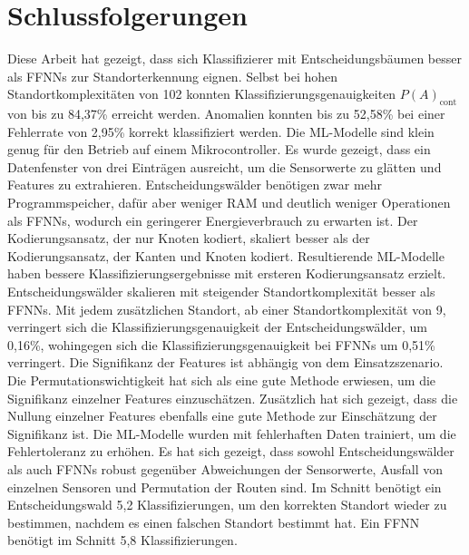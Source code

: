 \chapter{Schlussfolgerungen}
Diese Arbeit hat gezeigt, dass sich Klassifizierer mit Entscheidungsbäumen besser als FFNNs zur Standorterkennung eignen.
Selbst bei hohen Standortkomplexitäten von 102 konnten Klassifizierungsgenauigkeiten $P(A)_{\text{cont}}$ von bis zu 84,37\% erreicht werden.
Anomalien konnten bis zu 52,58\% bei einer Fehlerrate von 2,95\% korrekt klassifiziert werden.
\newline
\newline
Die ML-Modelle sind klein genug für den Betrieb auf einem Mikrocontroller.
Es wurde gezeigt, dass ein Datenfenster von drei Einträgen ausreicht, um die Sensorwerte zu glätten und Features zu extrahieren.
Entscheidungswälder benötigen zwar mehr Programmspeicher, dafür aber weniger RAM und deutlich weniger Operationen als FFNNs, wodurch
ein geringerer Energieverbrauch zu erwarten ist.
\newline
\newline
Der Kodierungsansatz, der nur Knoten kodiert, skaliert besser als der Kodierungsansatz, der Kanten und Knoten kodiert.
Resultierende ML-Modelle haben bessere Klassifizierungsergebnisse mit ersteren Kodierungsansatz erzielt.
Entscheidungswälder skalieren mit steigender Standortkomplexität besser als FFNNs.
Mit jedem zusätzlichen Standort, ab einer Standortkomplexität von 9, verringert sich die Klassifizierungsgenauigkeit der Entscheidungswälder,
um 0,16\%, wohingegen sich die Klassifizierungsgenauigkeit bei FFNNs um 0,51\% verringert.
\newline
\newline
Die Signifikanz der Features ist abhängig von dem Einsatzszenario.
Die Permutationswichtigkeit hat sich als eine gute Methode erwiesen, um die Signifikanz einzelner Features einzuschätzen.
Zusätzlich hat sich gezeigt, dass die Nullung einzelner Features ebenfalls eine gute Methode zur Einschätzung der Signifikanz ist.
\newpage
Die ML-Modelle wurden mit fehlerhaften Daten trainiert, um die Fehlertoleranz zu erhöhen.
Es hat sich gezeigt, dass sowohl Entscheidungswälder als auch FFNNs robust gegenüber Abweichungen der Sensorwerte,
Ausfall von einzelnen Sensoren und Permutation der Routen sind.
Im Schnitt benötigt ein Entscheidungswald 5,2 Klassifizierungen, um den korrekten Standort wieder zu bestimmen,
nachdem es einen falschen Standort bestimmt hat.
Ein FFNN benötigt im Schnitt 5,8 Klassifizierungen.
\newline
